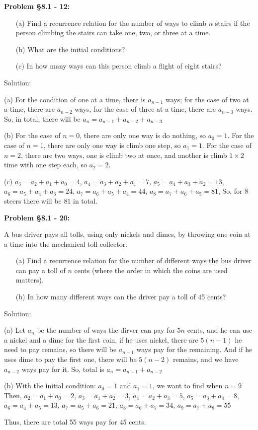 \documentclass{article}
\newenvironment{problem}[1]
    {\begin{mdframed}[default]
    \textbf{Problem #1:}
    }
    {\end{mdframed}
    }
\begin{document}
\begin{problem}{\S 8.1 - 12}
\begin{itemize}
    \item[(a)] Find a recurrence relation for the number of ways to climb $n$ stairs if the person climbing the stairs can take one, two, or three at a time.
    \item[(b)] What are the initial conditions?
    \item[(c)] In how many ways can this person climb a flight of eight stairs?
\end{itemize}
Solution:

(a) For the condition of one at a time, there is $a_{n-1}$ ways; for the case of two at a time, there are $a_{n-2}$ ways, for the case of three at a time, there are $a_{n-3}$ ways.
So, in total, there will be $a_n=a_{n-1}+a_{n-2}+a_{n-3}$

(b) For the case of $n=0$, there are only one way is do nothing, so $a_0=1$. 
For the case of $n=1$, there are only one way is climb one step, so $a_1=1$.
For the case of $n=2$, there are two ways, one is climb two at once, and another is climb $1\times2$ time with one step each, so $a_2=2$.

(c) $a_3=a_2+a_1+a_0=4$, $a_4=a_3+a_2+a_1=7$, $a_5=a_4+a_3+a_2=13$, $a_6=a_5+a_4+a_3=24$, $a_7=a_6+a_5+a_4=44$, $a_8=a_7+a_6+a_5=81$, So, for 8 steers there will be $81$ in total.



\end{problem}

\begin{problem}{\S 8.1 - 20}
A bus driver pays all tolls, using only nickels and dimes, by throwing one coin at a time into the mechanical toll collector.
\begin{itemize}
    \item[(a)] Find a recurrence relation for the number of different ways the bus driver can pay a toll of $n$ cents (where the order in which the coins are used matters).
    \item[(b)] In how many different ways can the driver pay a toll of 45 cents?
\end{itemize}

Solution:

(a) Let $a_n$ be the number of ways the dirver can pay for $5n$ cents, and he can use a nickel and a dime for the first coin, if he uses nickel, there are $5(n-1)$ he need to pay remains, so there will be $a_{n-1}$ ways pay for the remaining. And if he uses dime to pay the first one, there will be $5(n-2)$ remains, and we have $a_{n-2}$ ways pay for it. So, total is $a_n=a_{n-1}+a_{n-2}$

(b) With the initial condition: $a_0=1$ and $a_1=1$, we want to find when $n=9$
Then, $a_2=a_1+a_0=2$, $a_3=a_1+a_2=3$, $a_4=a_2+a_3=5$, $a_5=a_3+a_4=8$, $a_6=a_4+a_5=13$, $a_7=a_5+a_6=21$, $a_8=a_6+a_7=34$, $a_9=a_7+a_8=55$

Thus, there are total 55 ways pay for 45 cents.

\end{problem}
\end{document}
